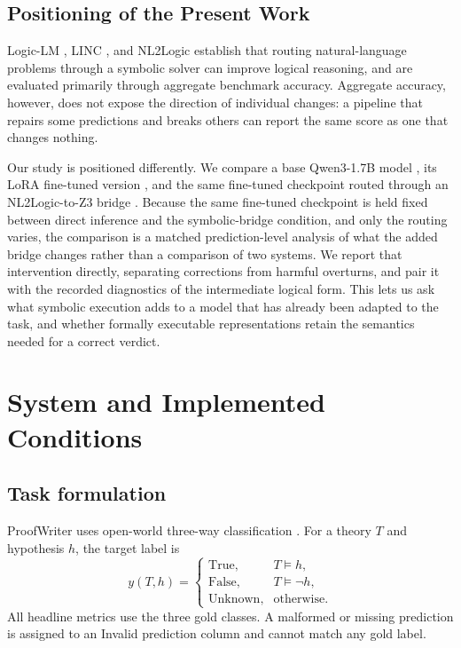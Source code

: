 \documentclass[conference]{IEEEtran}
\begin{document}
\subsection{Positioning of the Present Work}

Logic-LM \cite{logiclm}, LINC \cite{linc}, and NL2Logic \cite{nl2logic} establish that routing natural-language problems through a symbolic solver can improve logical reasoning, and are evaluated primarily through aggregate benchmark accuracy. Aggregate accuracy, however, does not expose the direction of individual changes: a pipeline that repairs some predictions and breaks others can report the same score as one that changes nothing.

Our study is positioned differently. We compare a base Qwen3-1.7B model \cite{qwen3}, its LoRA fine-tuned version \cite{lora}, and the same fine-tuned checkpoint routed through an NL2Logic-to-Z3 bridge \cite{nl2logic,z3}. Because the same fine-tuned checkpoint is held fixed between direct inference and the symbolic-bridge condition, and only the routing varies, the comparison is a matched prediction-level analysis of what the added bridge changes rather than a comparison of two systems. We report that intervention directly, separating corrections from harmful overturns, and pair it with the recorded diagnostics of the intermediate logical form. This lets us ask what symbolic execution adds to a model that has already been adapted to the task, and whether formally executable representations retain the semantics needed for a correct verdict.
\section{System and Implemented Conditions}
\subsection{Task formulation}
ProofWriter uses open-world three-way classification \cite{proofwriter}. For a theory $T$ and hypothesis $h$, the target label is
\begin{equation}
y(T,h)=\begin{cases}
\text{True}, & T\models h,\\
\text{False}, & T\models \neg h,\\
\text{Unknown}, & \text{otherwise}.
\end{cases}
\end{equation}
All headline metrics use the three gold classes. A malformed or missing prediction is assigned to an Invalid prediction column and cannot match any gold label.
\end{document}

